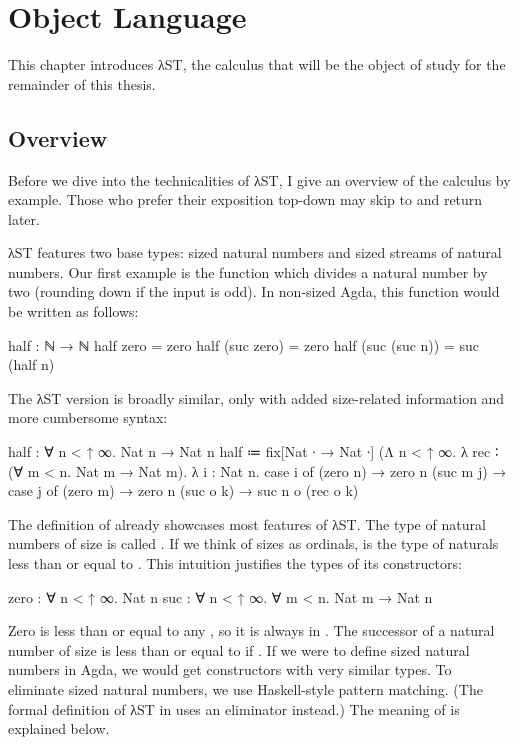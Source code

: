 \chapter{Object Language}
\label{sec:source}

This chapter introduces λST, the calculus that will be the object of study for
the remainder of this thesis.


\section{Overview}
\label{sec:source:overview}

Before we dive into the technicalities of λST, I give an overview of the
calculus by example. Those who prefer their exposition top-down may skip to
 and return later.

λST features two base types: sized natural numbers and sized streams of natural
numbers. Our first example is the function  which divides a natural
number by two (rounding down if the input is odd). In non-sized Agda, this
function would be written as follows:
\begin{code}
  half : ℕ → ℕ
  half zero = zero
  half (suc zero) = zero
  half (suc (suc n)) = suc (half n)
\end{code}
The λST version is broadly similar, only with added size-related information and
more cumbersome syntax:
\begin{code}
  half : ∀ n < ↑ ∞. Nat n → Nat n
  half ≔ fix[Nat ∙ → Nat ∙]
          (Λ n < ↑ ∞. λ rec ∶ (∀ m < n. Nat m → Nat m). λ i : Nat n.
            case i of
              (zero n)  → zero n
              (suc m j) →
                case j of
                  (zero m)  → zero n
                  (suc o k) → suc n o (rec o k)
\end{code}

The definition of  already showcases most features of λST. The type
of natural numbers of size  is called . If we think of
sizes as ordinals,  is the type of naturals less than or equal to
. This intuition justifies the types of its constructors:
\begin{code}
  zero : ∀ n < ↑ ∞. Nat n
  suc  : ∀ n < ↑ ∞. ∀ m < n. Nat m → Nat n
\end{code}
Zero is less than or equal to any , so it is always in .
The successor of a natural number  of size  is less than or
equal to  if . If we were to define sized natural numbers
in Agda, we would get constructors with very similar types. To eliminate sized
natural numbers, we use Haskell-style pattern matching. (The formal definition
of λST in  uses an eliminator instead.) The meaning of
 is explained below.

